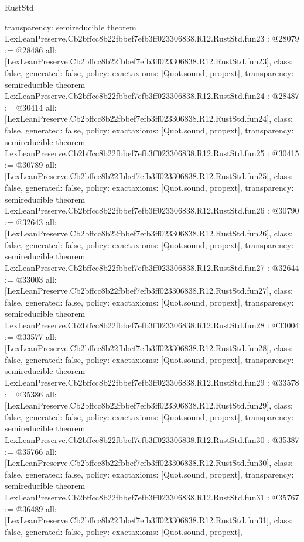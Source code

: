 \begin{lexlean}{RustStd}
\begin{coremodule}
{  transparency: semireducible
}
theorem LexLeanPreserve.Cb2bffcc8b22fbbef7efb3ff023306838.R12.RustStd.fun23 : @28079 := @28486 {
  all: [LexLeanPreserve.Cb2bffcc8b22fbbef7efb3ff023306838.R12.RustStd.fun23],
  class: false,
  generated: false,
  policy: exact{axioms: [Quot.sound, propext]},
  transparency: semireducible
}
theorem LexLeanPreserve.Cb2bffcc8b22fbbef7efb3ff023306838.R12.RustStd.fun24 : @28487 := @30414 {
  all: [LexLeanPreserve.Cb2bffcc8b22fbbef7efb3ff023306838.R12.RustStd.fun24],
  class: false,
  generated: false,
  policy: exact{axioms: [Quot.sound, propext]},
  transparency: semireducible
}
theorem LexLeanPreserve.Cb2bffcc8b22fbbef7efb3ff023306838.R12.RustStd.fun25 : @30415 := @30789 {
  all: [LexLeanPreserve.Cb2bffcc8b22fbbef7efb3ff023306838.R12.RustStd.fun25],
  class: false,
  generated: false,
  policy: exact{axioms: [Quot.sound, propext]},
  transparency: semireducible
}
theorem LexLeanPreserve.Cb2bffcc8b22fbbef7efb3ff023306838.R12.RustStd.fun26 : @30790 := @32643 {
  all: [LexLeanPreserve.Cb2bffcc8b22fbbef7efb3ff023306838.R12.RustStd.fun26],
  class: false,
  generated: false,
  policy: exact{axioms: [Quot.sound, propext]},
  transparency: semireducible
}
theorem LexLeanPreserve.Cb2bffcc8b22fbbef7efb3ff023306838.R12.RustStd.fun27 : @32644 := @33003 {
  all: [LexLeanPreserve.Cb2bffcc8b22fbbef7efb3ff023306838.R12.RustStd.fun27],
  class: false,
  generated: false,
  policy: exact{axioms: [Quot.sound, propext]},
  transparency: semireducible
}
theorem LexLeanPreserve.Cb2bffcc8b22fbbef7efb3ff023306838.R12.RustStd.fun28 : @33004 := @33577 {
  all: [LexLeanPreserve.Cb2bffcc8b22fbbef7efb3ff023306838.R12.RustStd.fun28],
  class: false,
  generated: false,
  policy: exact{axioms: [Quot.sound, propext]},
  transparency: semireducible
}
theorem LexLeanPreserve.Cb2bffcc8b22fbbef7efb3ff023306838.R12.RustStd.fun29 : @33578 := @35386 {
  all: [LexLeanPreserve.Cb2bffcc8b22fbbef7efb3ff023306838.R12.RustStd.fun29],
  class: false,
  generated: false,
  policy: exact{axioms: [Quot.sound, propext]},
  transparency: semireducible
}
theorem LexLeanPreserve.Cb2bffcc8b22fbbef7efb3ff023306838.R12.RustStd.fun30 : @35387 := @35766 {
  all: [LexLeanPreserve.Cb2bffcc8b22fbbef7efb3ff023306838.R12.RustStd.fun30],
  class: false,
  generated: false,
  policy: exact{axioms: [Quot.sound, propext]},
  transparency: semireducible
}
theorem LexLeanPreserve.Cb2bffcc8b22fbbef7efb3ff023306838.R12.RustStd.fun31 : @35767 := @36489 {
  all: [LexLeanPreserve.Cb2bffcc8b22fbbef7efb3ff023306838.R12.RustStd.fun31],
  class: false,
  generated: false,
  policy: exact{axioms: [Quot.sound, propext]},
}
\end{coremodule}
\end{lexlean}
